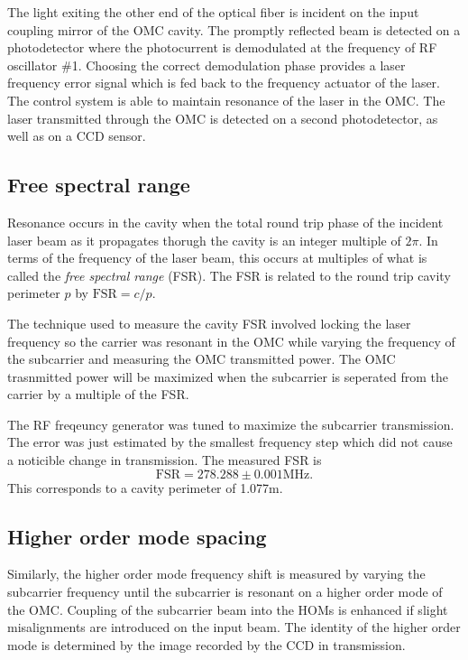 The light exiting the other end of the optical fiber is incident on the input coupling mirror of the OMC cavity. %
The promptly reflected beam is detected on a photodetector where the photocurrent is demodulated at the frequency of RF oscillator \#1. %
Choosing the correct demodulation phase provides a laser frequency error signal which is fed back to the frequency actuator of the laser. %
The control system is able to maintain resonance of the laser in the OMC. %
The laser transmitted through the OMC is detected on a second photodetector, as well as on a CCD sensor.

\subsection{Free spectral range}
Resonance occurs in the cavity when the total round trip phase of the incident laser beam as it propagates thorugh the cavity is an integer multiple of $2\pi$. %
In terms of the frequency of the laser beam, this occurs at multiples of what is called the \emph{free spectral range} (FSR). %
The FSR is related to the round trip cavity perimeter $p$ by $\mathrm{FSR}=c/p$.

The technique used to measure the cavity FSR involved locking the laser frequency so the carrier was resonant in the OMC while varying the frequency of the subcarrier and measuring the OMC transmitted power. %
The OMC trasnmitted power will be maximized when the subcarrier is seperated from the carrier by a multiple of the FSR.

The RF freqeuncy generator was tuned to maximize the subcarrier transmission. %
The error was just estimated by the smallest frequency step which did not cause a noticible change in transmission. %
The measured FSR is
\begin{equation}
\mathrm{FSR}=278.288\pm0.001\text{MHz}.
\end{equation}
This corresponds to a cavity perimeter of 1.077m.

\subsection{Higher order mode spacing}
Similarly, the higher order mode frequency shift is measured by varying the subcarrier frequency until the subcarrier is resonant on a higher order mode of the OMC. %
Coupling of the subcarrier beam into the HOMs is enhanced if slight misalignments are introduced on the input beam. %
The identity of the higher order mode is determined by the image recorded by the CCD in transmission.

